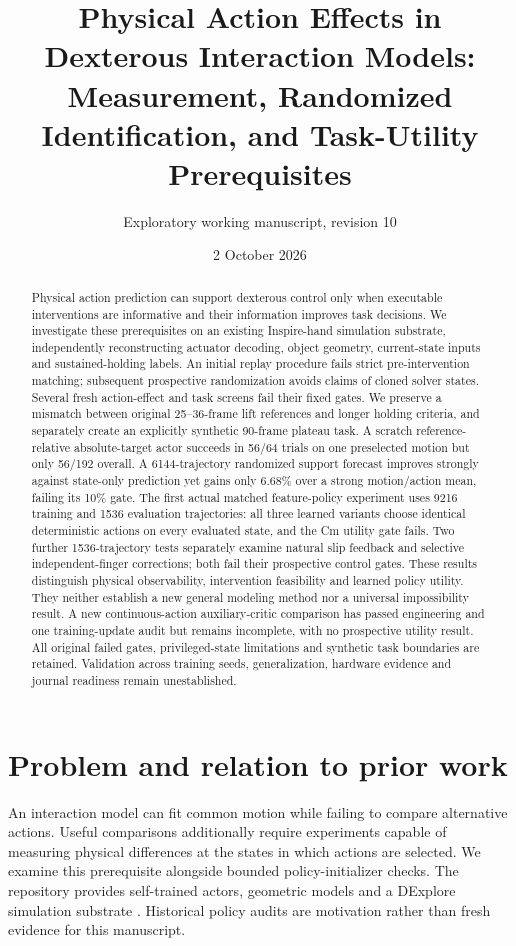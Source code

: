 \documentclass[10pt]{article}
\title{Physical Action Effects in Dexterous Interaction Models:\\Measurement, Randomized Identification, and Task-Utility Prerequisites}
\author{Exploratory working manuscript, revision 10}
\date{2 October 2026}
\begin{document}
\maketitle
\begin{abstract}
Physical action prediction can support dexterous control only when executable
interventions are informative and their information improves task decisions.
We investigate these prerequisites on an existing Inspire-hand simulation
substrate, independently reconstructing actuator decoding, object geometry,
current-state inputs and sustained-holding labels. An initial replay procedure
fails strict pre-intervention matching; subsequent prospective randomization
avoids claims of cloned solver states. Several fresh action-effect and task
screens fail their fixed gates. We preserve a mismatch between original
25--36-frame lift references and longer holding criteria, and separately create
an explicitly synthetic 90-frame plateau task. A scratch reference-relative
absolute-target actor succeeds in 56/64 trials on one preselected motion but only
56/192 overall. A 6144-trajectory randomized support forecast improves strongly
against state-only prediction yet gains only 6.68\% over a strong motion/action
mean, failing its 10\% gate. The first actual matched feature-policy experiment
uses 9216 training and 1536 evaluation trajectories: all three learned variants
choose identical deterministic actions on every evaluated state, and the Cm
utility gate fails. Two further 1536-trajectory tests separately examine natural
slip feedback and selective independent-finger corrections; both fail their
prospective control gates. These results distinguish physical observability,
intervention feasibility and learned policy utility. They neither establish a
new general modeling method nor a universal impossibility result. A new
continuous-action auxiliary-critic comparison has passed engineering and one
training-update audit but remains incomplete, with no prospective utility result.
All original failed gates, privileged-state limitations and synthetic task
boundaries are retained. Validation across training seeds, generalization,
hardware evidence and journal readiness remain unestablished.
\end{abstract}

\section{Problem and relation to prior work}
An interaction model can fit common motion while failing to compare alternative actions.
Useful comparisons additionally require experiments capable of measuring physical
differences at the states in which actions are selected. We examine this prerequisite
alongside bounded policy-initializer checks. The repository provides self-trained
actors, geometric models and a DExplore simulation substrate \cite{xu2025}. Historical
policy audits are motivation rather than fresh evidence for this manuscript.
\end{document}
